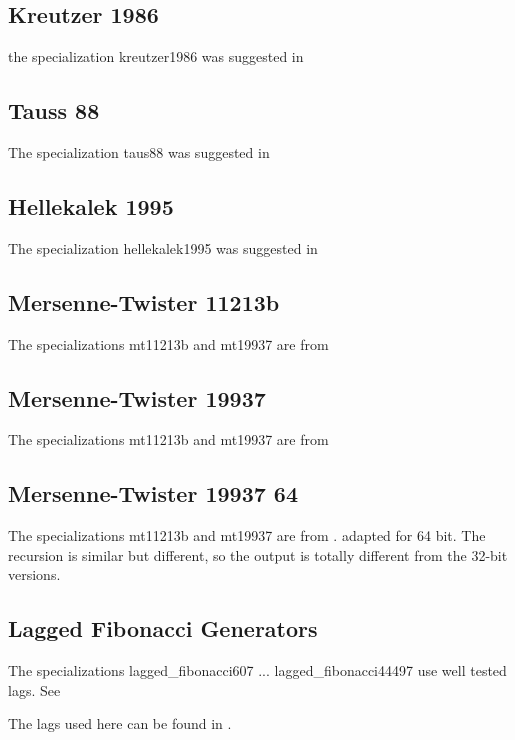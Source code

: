 \subsection{Kreutzer 1986}
the specialization kreutzer1986 was suggested in \cite{Kreutzer_1986}



\subsection{Tauss 88}
The specialization taus88 was suggested in \cite{LEcuyer_1996}



\subsection{Hellekalek 1995}
The specialization hellekalek1995 was suggested in \cite{Hellekalek_1995}





\subsection{Mersenne-Twister 11213b}
The specializations mt11213b and mt19937 are from \cite{Matsumoto_1998}



\subsection{Mersenne-Twister 19937}
The specializations mt11213b and mt19937 are from \cite{Matsumoto_1998}


\subsection{Mersenne-Twister 19937 64}
The specializations mt11213b and mt19937 are from \cite{Matsumoto_1998}. adapted for 64 bit.
The recursion is similar but different, so the output is totally different from the 32-bit versions. 


\subsection{Lagged Fibonacci Generators}
The specializations lagged\_fibonacci607 ... lagged\_fibonacci44497 use well tested lags. See \cite{Brent_1992a}

The lags used here can be found in \cite{Brent_1992b}.




